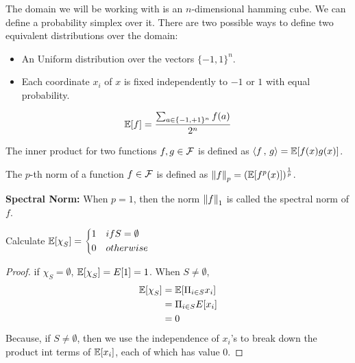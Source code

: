 The domain we will be working with is an $n$-dimensional hamming cube. We can define a probability simplex over it. There are two possible ways to define two equivalent distributions over the domain:

\begin{itemize}
    \item An Uniform distribution over the vectors $\{-1,1\}^n$.
    \item Each coordinate $x_i$ of $x$ is fixed independently to $-1$ or $1$ with equal probability.
\end{itemize}

\begin{definition}
    \begin{align*}
        \mathbb{E}[f] = \frac{\sum_{a \in {\{-1,+1\}^n}} f(a)}{2^n}
    \end{align*}
\end{definition}

\begin{definition}
    The inner product for two functions $f,g \in \mathcal{F}$ is defined as $\left\langle {f} \,,\, {g} \right\rangle = \mathbb{E}[f(x)g(x)]$.
\end{definition}

\begin{definition}[p-th norm]
    The $p$-th norm of a function $f \in \mathcal{F}$ is defined as $\left\|{f}\right\|_p = (\mathbb{E}[f^p(x)])^{\frac{1}{p}}$.
\end{definition}

\textbf{Spectral Norm:} When $p = 1$, then the norm $\left\|{f}\right\|_1$ is called the spectral norm of $f$.

\begin{lemma}
    Calculate $\E[\chi_S] = \begin{dcases}
        1 &if S = \emptyset\\ 0 &otherwise
    \end{dcases}$  
    \begin{proof}
    if $\chi_S = \emptyset$, $\E[\chi_S] = E[1] = 1$.
    When $S \neq \emptyset$,
    \begin{align*}
        \E[\chi_S]  &= \E[\Pi_{i \in S} x_i]\\
                    &=\Pi_{i \in S} E[x_i] \\
                    &= 0 
    \end{align*}    
    Because, if $S \neq \emptyset$, then we use the independence of $x_i$'s to break down the product int terms of $\mathbb{E}[x_i]$, each of which has value $0$.
    \end{proof}
\end{lemma}

